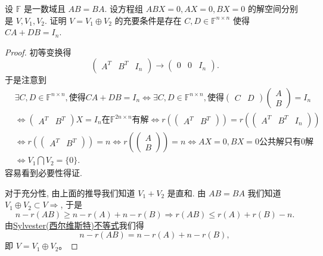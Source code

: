 \documentclass[../../main.tex]{subfiles}
\begin{document}
\begin{example}
设 \( \mathbb{F} \) 是一数域且 \( AB = BA \). 设方程组 \( ABX = 0, AX = 0, BX = 0 \) 的解空间分别是 \( V, V_1, V_2 \). 证明 \( V = V_1 \oplus V_2 \) 的充要条件是存在 \( C, D \in \mathbb{F}^{n \times n} \) 使得 \( CA + DB = I_n \).
\end{example}
\begin{proof}
初等变换得
\[
\begin{pmatrix} A^T & B^T & I_n \end{pmatrix} \to \begin{pmatrix} 0 & 0 & I_n \end{pmatrix}.
\]
于是注意到
\[
\begin{aligned}
&\exists C, D \in \mathbb{F}^{n \times n}, \text{使得} CA + DB = I_n \iff \exists C, D \in \mathbb{F}^{n \times n}, \text{使得} \begin{pmatrix} C & D \end{pmatrix} \begin{pmatrix} A \\ B \end{pmatrix} = I_n \\
&\iff \begin{pmatrix} A^T & B^T \end{pmatrix} X = I_n \text{在} \mathbb{F}^{2n \times n} \text{有解} \iff r\left( \begin{pmatrix} A^T & B^T \end{pmatrix} \right) = r\left( \begin{pmatrix} A^T & B^T & I_n \end{pmatrix} \right) \\
&\iff r\left( \begin{pmatrix} A^T & B^T \end{pmatrix} \right) = n \iff r\left( \begin{pmatrix} A \\ B \end{pmatrix} \right) = n \iff AX = 0, BX = 0 \text{公共解只有} 0 \text{解} \\
&\iff V_1 \bigcap V_2 = \{0\}.
\end{aligned}
\]
容易看到必要性得证.

对于充分性, 由上面的推导我们知道 \( V_1 + V_2 \) 是直和. 由 \( AB = BA \) 我们知道 \( V_1 \oplus V_2 \subset V \Rightarrow \), 于是
\[
n-r(AB)\geqslant n-r(A)+n-r(B)\Rightarrow r(AB)\leqslant r(A)+r(B)-n.
\]
由\hyperref[proposition:Sylvester(西尔维斯特)不等式]{Sylvester(西尔维斯特)不等式}我们得
\[
n - r(AB) = n - r(A) + n - r(B),
\]
即 \( V = V_1 \oplus V_2 \)。

\end{proof}
\end{document}

